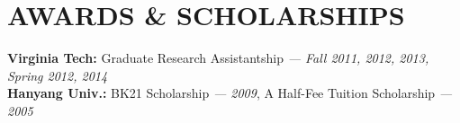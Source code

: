 \section{AWARDS \& SCHOLARSHIPS}
\vspace{0.07in}
{\bf Virginia Tech:} Graduate Research Assistantship {\footnotesize{\it --- Fall
2011, 2012, 2013, Spring 2012, 2014}} \\
{\bf Hanyang Univ.:} BK21 Scholarship {\footnotesize{\it --- 2009}},
A Half-Fee Tuition Scholarship {\footnotesize{\it --- 2005}}

